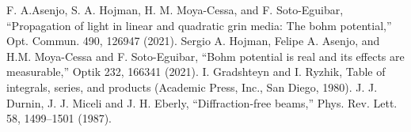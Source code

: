 \documentclass[aps,pra,reprint,superscriptaddress]{revtex4-2}
\begin{document}
\begin{thebibliography}{9}
 F. A.Asenjo, S. A. Hojman, H. M. Moya-Cessa, and F. Soto-Eguibar,
“Propagation of light in linear and quadratic grin media: The bohm
potential,” Opt. Commun. 490, 126947 (2021).
  Sergio A. Hojman, Felipe A. Asenjo, and H.M. Moya-Cessa and F. Soto-Eguibar,
“Bohm potential is real and its effects are measurable,” Optik 232,
166341 (2021).
 I. Gradshteyn and I. Ryzhik, Table of integrals, series, and products
(Academic Press, Inc., San Diego, 1980).
 J. J. Durnin, J. J. Miceli and J. H. Eberly, “Diffraction-free beams,” Phys.
Rev. Lett. 58, 1499–1501 (1987).
\end{thebibliography}
\end{document}
